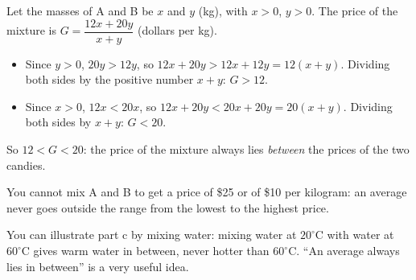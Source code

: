 {
Let the masses of A and B be $x$ and $y$ (kg), with $x>0$, $y>0$. The price of the mixture is $G=\dfrac{12x+20y}{x+y}$ (dollars per kg).
\begin{itemize}[leftmargin=1.3em,itemsep=1pt]
\item Since $y>0$, $20y>12y$, so $12x+20y>12x+12y=12(x+y)$. Dividing both sides by the positive number $x+y$: $G>12$.
\item Since $x>0$, $12x<20x$, so $12x+20y<20x+20y=20(x+y)$. Dividing both sides by $x+y$: $G<20$.
\end{itemize}
So $12<G<20$: the price of the mixture always lies \emph{between} the prices of the two candies.
\begin{warnbox}You cannot mix A and B to get a price of \$25 or of \$10 per kilogram: an average never goes outside the range from the lowest to the highest price.\end{warnbox}
\begin{parentbox}You can illustrate part c by mixing water: mixing water at $20^\circ$C with water at $60^\circ$C gives warm water in between, never hotter than $60^\circ$C. ``An average always lies in between'' is a very useful idea.\end{parentbox}
}
